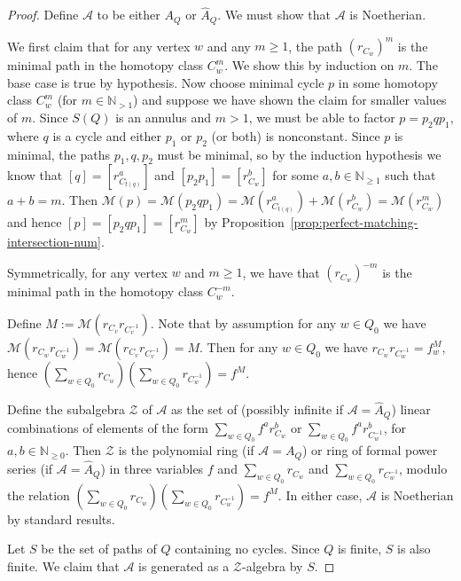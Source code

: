 \documentclass[10pt,a4paper]{amsart}
\newcommand{\A}{{\mathcal A}}
\begin{document}
\begin{proof}
	Define $\A$ to be either $A_Q$ or $\widehat A_Q$. We must show that $\A$ is Noetherian.
	
	We first claim that for any vertex $w$ and any $m\geq1$, the path $(r_{C_w})^m$ is the minimal path in the homotopy class $C_w^m$. We show this by induction on $m$. The base case is true by hypothesis.
	Now choose minimal cycle $p$ in some homotopy class $C_w^m$ (for $m\in\mathbb N_{>1}$) and suppose we have shown the claim for smaller values of $m$.
	Since $S(Q)$ is an annulus and $m>1$, we must be able to factor $p=p_2 q p_1$, where $q$ is a cycle and either $p_1$ or $p_2$ (or both) is nonconstant. Since $p$ is minimal, the paths $p_1,q,p_2$ must be minimal, so by the induction hypothesis we know that $[q]=[r_{C_{t(q)}}^a]$ and $[p_2p_1]=[r_{C_w}^b]$ 
	for some $a,b\in\mathbb N_{\geq1}$ such that $a+b=m$. 
	{Then $\mathcal M(p)=\mathcal M(p_2 qp_1)=\mathcal M(r_{C_{t(q)}}^a)+\mathcal M(r_{C_{w}}^b)=\mathcal M(r_{C_w}^m)$}
	and hence $[p]=[p_2qp_1]=[r_{C_w}^m]$ by Proposition~\ref{prop:perfect-matching-intersection-num}.

	Symmetrically, for any vertex $w$ and $m\geq1$, we have that $(r_{C_w})^{-m}$ is the minimal path in the homotopy class $C_w^{-m}$.

	Define $M:=\mathcal M(r_{C_v}r_{C_v^{-1}})$.
	Note that by assumption for any $w\in Q_0$ we have 
	$\mathcal M(r_{C_w}r_{C_{w}^{-1}})=\mathcal M(r_{C_v}r_{C_{v}^{-1}})=M$. Then for any $w\in Q_0$ we have $r_{C_w}r_{C_w^{-1}}=f_w^M$, hence $\left(\sum_{w\in Q_0}r_{C_w}\right)\left(\sum_{w\in Q_0}r_{C_w^{-1}}\right)=f^M$.

	Define the subalgebra $\mathcal Z$ of $\mathcal A$ as the set of (possibly infinite if $\mathcal A=\widehat A_Q$) linear combinations of elements of the form $\sum_{w\in Q_0}f^ar_{C_w}^b$ or $\sum_{w\in Q_0}f^ar_{C_w^{-1}}^b$, for $a,b\in\mathbb N_{\geq0}$.
	Then $\mathcal Z$ is the polynomial ring (if $\mathcal A=A_Q$) or ring of formal power series (if $\mathcal A=\widehat A_Q$) in three variables $f$ and $\sum_{w\in Q_0}r_{C_w}$ and $\sum_{w\in Q_0}r_{C_w^{-1}}$, modulo the relation
	$\left(\sum_{w\in Q_0}r_{C_w}\right)\left(\sum_{w\in Q_0}r_{C_w^{-1}}\right)=f^M$.
	In either case, $\mathcal A$ is Noetherian by standard results.

	Let $S$ be the set of paths of $Q$ containing no cycles. Since $Q$ is finite, $S$ is also finite.
	We claim that $\mathcal A$ is generated as a $\mathcal Z$-algebra by $S$.


\end{proof}
\end{document}
